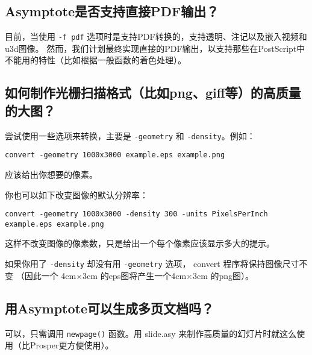 \subsection{\label{Q9.4}Asymptote是否支持直接PDF输出？}
目前，当使用 \verb|-f pdf| 选项时是支持PDF转换的，支持透明、注记以及嵌入视频和u3d图像。
然而，我们计划最终实现直接的PDF输出，以支持那些在PostScript中不能用的特性（比如根据一般函数的着色处理）。

\subsection{\label{Q9.5}如何制作光栅扫描格式（比如png、giff等）的高质量的大图？}
尝试使用一些选项来转换，主要是 \verb|-geometry| 和 \verb|-density|。例如：
\begin{verbatim}
convert -geometry 1000x3000 example.eps example.png 
\end{verbatim}
应该给出你想要的像素。

你也可以如下改变图像的默认分辨率：
\begin{verbatim}
convert -geometry 1000x3000 -density 300 -units PixelsPerInch example.eps example.png 
\end{verbatim}
这样不改变图像的像素数，只是给出一个每个像素应该显示多大的提示。

如果你用了 \verb|-density| 却没有用 \verb|-geometry| 选项， convert 程序将保持图像尺寸不变
（因此一个 4cm$\times$3cm 的eps图将产生一个4cm$\times$3cm 的png图）。

\subsection{\label{Q9.6}用Asymptote可以生成多页文档吗？}
可以，只需调用 \verb|newpage()| 函数。用 slide.asy 来制作高质量的幻灯片时就这么使用（比Prosper更方便使用）。



